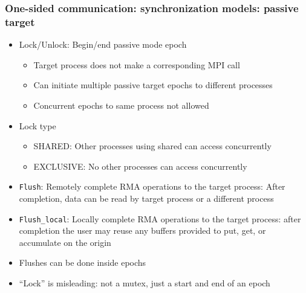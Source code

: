 \documentclass{beamer}
\begin{document}
\begin{frame}[fragile]
  \frametitle{One-sided communication: synchronization models: passive target }
\begin{itemize}
\item Lock/Unlock: Begin/end passive mode epoch
\begin{itemize}
\item Target process does not make a corresponding MPI call
\item Can initiate multiple passive target epochs to different processes
\item Concurrent epochs to same process not allowed
\end{itemize}
\item Lock type
\begin{itemize}
\item {\color{mycolorcode}SHARED}: Other processes using shared can access concurrently
\item {\color{mycolorcode}EXCLUSIVE}: No other processes can access concurrently
\end{itemize}
\item {\color{mycolorcode}\verb|Flush|}: Remotely complete RMA operations to the target process: After completion, data can be read by target process or a different
process
\item {\color{mycolorcode}\verb|Flush_local|}: Locally complete RMA operations to the target process: after completion the user may reuse any buffers provided to put, get, or accumulate on the origin
\item Flushes can be done inside epochs
\item ``Lock'' is misleading: not a mutex, just a start and end of an epoch
\end{itemize}
\end{frame}
\end{document}
